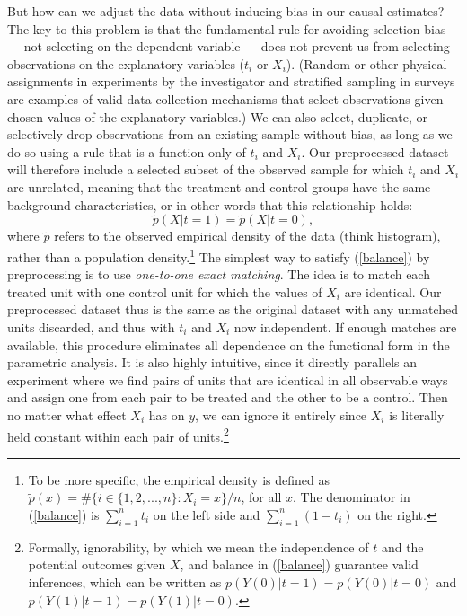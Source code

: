 \documentclass[11pt,titlepage]{article}
\begin{document}
But how can we adjust the data without inducing bias in our causal
estimates?  The key to this problem is that the fundamental rule for
avoiding selection bias --- not selecting on the dependent variable
--- does not prevent us from selecting observations on the explanatory
variables ($t_i$ or $X_i$).  (Random or other physical assignments in
experiments by the investigator and stratified sampling in surveys are
examples of valid data collection mechanisms that select observations
given chosen values of the explanatory variables.)  We can also
select, duplicate, or selectively drop observations from an existing
sample without bias, as long as we do so using a rule that is a
function only of $t_i$ and $X_i$.  Our preprocessed dataset will
therefore include a selected subset of the observed sample for which
$t_i$ and $X_i$ are unrelated, meaning that the treatment and control
groups have the same background characteristics, or in other words
that this relationship holds:
\begin{equation}
  \label{balance}
  \tilde p(X|t=1) = \tilde p(X|t=0),
\end{equation}
where $\tilde p$ refers to the observed empirical density of the data
(think histogram), rather than a population density.\footnote{To be
  more specific, the empirical density is defined as $\tilde p(x) = \#
  \{ i\in \{1, 2, ..., n \}: X_i = x \} / n$, for all $x$.  The
    denominator in (\ref{balance}) is $\sum_{i=1}^n t_i$ on the left
    side and $\sum_{i=1}^n (1-t_i)$ on the right.}  The simplest way
  to satisfy (\ref{balance}) by preprocessing is to use
  \emph{one-to-one exact matching}.  The idea is to match each treated
  unit with one control unit for which the values of $X_i$ are
  identical.  Our preprocessed dataset thus is the same as the
  original dataset with any unmatched units discarded, and thus with
  $t_i$ and $X_i$ now independent.  If enough matches are available,
  this procedure eliminates all dependence on the functional form in
  the parametric analysis.  It is also highly intuitive, since it
  directly parallels an experiment where we find pairs of units that
  are identical in all observable ways and assign one from each pair
  to be treated and the other to be a control.  Then no matter what
  effect $X_i$ has on $y$, we can ignore it entirely since $X_i$ is
  literally held constant within each pair of
  units.\footnote{Formally, ignorability, by which we mean the
    independence of $t$ and the potential outcomes given $X$, and
    balance in (\ref{balance}) guarantee valid inferences, which can
    be written as $p(Y(0)|t=1)=p(Y(0)|t=0)$ and
    $p(Y(1)|t=1)=p(Y(1)|t=0)$.}
\end{document}
